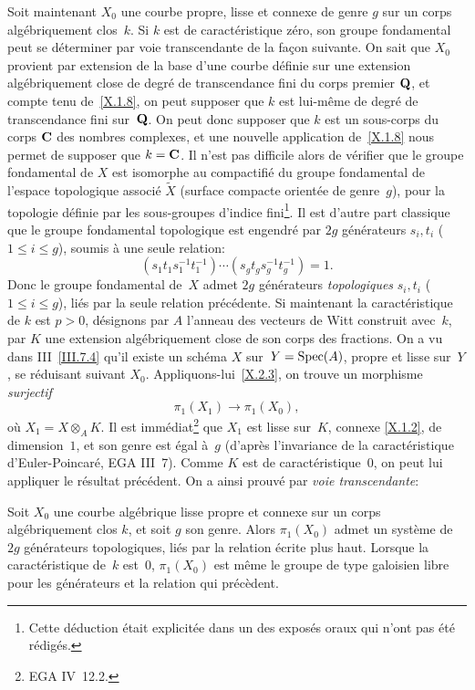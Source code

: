 Soit maintenant $X_0$ une courbe propre, lisse et connexe de genre $g$
sur un corps al\-g\'e\-bri\-quement clos~$k$. Si $k$ est de
caract\'eristique z\'ero, son groupe fondamental peut se
d\'eterminer par voie transcendante de la fa\c con suivante. On
sait que $X_0$ provient par extension de la base d'une courbe
d\'efinie
sur une extension alg\'ebriquement close de degr\'e de
transcendance fini du corps premier $\mathbf{Q}$, et compte tenu
de~\ref{X.1.8}, on peut supposer que $k$ est lui-m\^eme de degr\'e
de transcendance fini sur~$\mathbf{Q}$. On peut donc supposer que $k$ est un
sous-corps du corps $\mathbf{C}$ des nombres complexes, et une nouvelle
application de~\ref{X.1.8} nous permet de supposer que $k=\mathbf{C}$. Il
n'est pas difficile alors de v\'erifier que le groupe fondamental de
$X$ est isomorphe au compactifi\'e du groupe fondamental de l'espace
topologique associ\'e $\tilde X$ (surface compacte orient\'ee de
genre~$g$), pour la topologie d\'efinie par les sous-groupes
d'indice fini\footnote{Cette d\'eduction \'etait explicit\'ee
dans un des expos\'es oraux qui n'ont pas \'et\'e
r\'edig\'es.}. Il est d'autre part classique que le groupe
fondamental topologique est engendr\'e par $2g$ g\'en\'erateurs
$s_i,t_i$ ($1\le i\le g$), soumis \`a une seule relation:
$$
(s_1t_1s_1^{-1}t_1^{-1})\cdots(s_gt_gs_g^{-1}t_g^{-1})=1.
$$
Donc le groupe fondamental de~$X$ admet $2g$ g\'en\'erateurs
\emph{topologiques} $s_i,t_i$ ($1\le i\le g$), li\'es par la seule
relation pr\'ec\'edente. Si maintenant la caract\'eristique de
$k$ est $p>0$, d\'esignons par $A$ l'anneau des vecteurs de Witt
construit avec~$k$, par $K$ une extension alg\'ebriquement close de
son corps des fractions. On a vu dans III~\ref{III.7.4} qu'il
existe un sch\'ema $X$ sur~$Y=\operatorname{Spec}(A)$, propre et lisse sur~$Y$, se
r\'eduisant suivant $X_0$. Appliquons-lui~\ref{X.2.3}, on trouve un
morphisme \emph{surjectif}
$$
\pi_1(X_1)\to \pi_1(X_0),
$$
o\`u $X_1=X\otimes_A K$. Il est imm\'ediat\footnote{\cf EGA
IV~12.2.} que $X_1$ est lisse sur~$K$, connexe \eqref{X.1.2}, de
dimension~$1$, et son genre est \'egal \`a~$g$ (d'apr\`es
l'invariance de la caract\'eristique d'Euler-Poincar\'e, \cf EGA
III~7). Comme $K$ est de caract\'eristique~$0$, on peut lui
appliquer le r\'esultat pr\'ec\'edent. On a ainsi prouv\'e par
\emph{voie transcendante}:

\begin{theoreme}
\label{X.2.6}
Soit $X_0$ une courbe alg\'ebrique lisse propre et connexe sur un
corps al\-g\'e\-bri\-quement clos $k$, et soit $g$ son genre. Alors
$\pi_1(X_0)$ admet un syst\`eme de~$2g$ g\'en\'erateurs
topologiques, li\'es par la relation \'ecrite plus haut. Lorsque la
caract\'eristique de~$k$ est~$0$, $\pi_1(X_0)$ est m\^eme le
groupe de type galoisien libre pour les g\'en\'erateurs et la
relation qui pr\'ec\`edent.
\end{theoreme}

